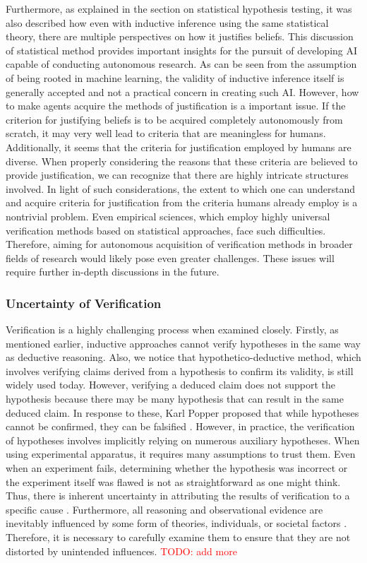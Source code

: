 \documentclass{book}
\begin{document}
Furthermore, as explained in the section on statistical hypothesis testing, it was also described how even with inductive inference using the same statistical theory, there are multiple perspectives on how it justifies beliefs. This discussion of statistical method provides important insights for the pursuit of developing AI capable of conducting autonomous research. As can be seen from the assumption of being rooted in machine learning, the validity of inductive inference itself is generally accepted and not a practical concern in creating such AI. However, how to make agents acquire the methods of justification is a important issue. If the criterion for justifying beliefs is to be acquired completely autonomously from scratch, it may very well lead to criteria that are meaningless for humans. Additionally, it seems that the criteria for justification employed by humans are diverse. When properly considering the reasons that these criteria are believed to provide justification, we can recognize that there are highly intricate structures involved. In light of such considerations, the extent to which one can understand and acquire criteria for justification from the criteria humans already employ is a nontrivial problem. Even empirical sciences, which employ highly universal verification methods based on statistical approaches, face such difficulties. Therefore, aiming for autonomous acquisition of verification methods in broader fields of research would likely pose even greater challenges. These issues will require further in-depth discussions in the future.

\subsubsection{Uncertainty of Verification}
Verification is a highly challenging process when examined closely. Firstly, as mentioned earlier, inductive approaches cannot verify hypotheses in the same way as deductive reasoning. Also, we notice that hypothetico-deductive method, which involves verifying claims derived from a hypothesis to confirm its validity, is still widely used today. However, verifying a deduced claim does not support the hypothesis because there may be many hypothesis that can result in the same deduced claim. In response to these, Karl Popper proposed that while hypotheses cannot be confirmed, they can be falsified \cite{sep-scientific-method}. However, in practice, the verification of hypotheses involves implicitly relying on numerous auxiliary hypotheses. When using experimental apparatus, it requires many assumptions to trust them. Even when an experiment fails, determining whether the hypothesis was incorrect or the experiment itself was flawed is not as straightforward as one might think. Thus, there is inherent uncertainty in attributing the results of verification to a specific cause \cite{chalmers2013thing,sep-physics-experiment,sep-scientific-underdetermination}. Furthermore, all reasoning and observational evidence are inevitably influenced by some form of theories, individuals, or societal factors \cite{sep-science-theory-observation}. Therefore, it is necessary to carefully examine them to ensure that they are not distorted by unintended influences. \textcolor{red}{TODO: add more}
\end{document}
